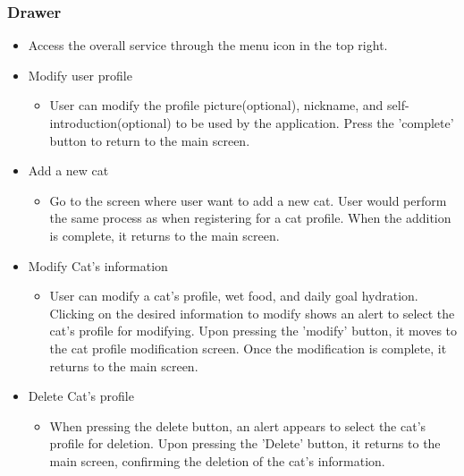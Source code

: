 \documentclass[conference]{IEEEtran}
\begin{document}
\subsubsection{Drawer}
\begin{itemize}
    \begin{itemize}
        \item Access the overall service through the menu icon in the top right.
        \item Modify user profile
            \begin{itemize}
                \item User can modify the profile picture(optional), nickname, and self-introduction(optional) to be used by the application. Press the 'complete' button to return to the main screen.
                \vspace{0.3cm}
            \end{itemize}
        \item Add a new cat
            \begin{itemize}
                \item Go to the screen where user want to add a new cat. User would perform the same process as when registering for a cat profile. When the addition is complete, it returns to the main screen.
                \vspace{0.3cm}
            \end{itemize}
        \item Modify Cat's information 
            \begin{itemize}
                \item User can modify a cat's profile, wet food, and daily goal hydration. Clicking on the desired information to modify shows an alert to select the cat's profile for modifying. Upon pressing the 'modify' button, it moves to the cat profile modification screen. Once the modification is complete, it returns to the main screen.
                \vspace{0.3cm}
            \end{itemize}
        \item Delete Cat's profile
            \begin{itemize}
                \item When pressing the delete button, an alert appears to select the cat's profile for deletion. Upon pressing the 'Delete' button, it returns to the main screen, confirming the deletion of the cat's information.
                \vspace{0.3cm}

\end{itemize}
\end{itemize}
\end{itemize}
\end{document}
